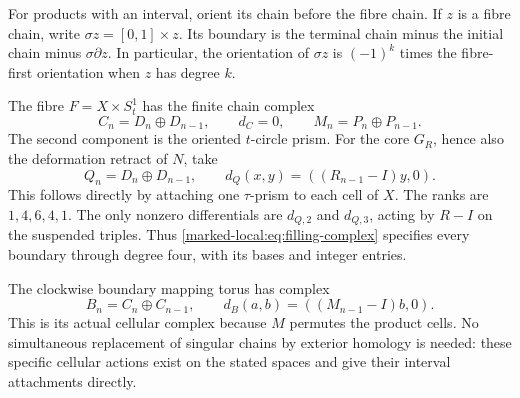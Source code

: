 For products with an interval, orient its chain before the fibre chain.
If $z$ is a fibre chain, write $\sigma z=[0,1]\times z$.
Its boundary is the terminal chain minus the initial chain minus
$\sigma\partial z$. In particular, the orientation of $\sigma z$
is $(-1)^k$ times the fibre-first orientation when $z$ has degree $k$.

The fibre $F=X\times S^1_t$ has the finite chain complex
\begin{equation}\label{marked-local:eq:fibre-complex}
 C_n=D_n\oplus D_{n-1},\qquad d_C=0,
 \qquad M_n=P_n\oplus P_{n-1}.
\end{equation}
The second component is the oriented $t$-circle prism.
For the core $G_R$, hence also the deformation retract of $N$, take
\begin{equation}\label{marked-local:eq:filling-complex}
 Q_n=D_n\oplus D_{n-1},\qquad
 d_Q(x,y)=((R_{n-1}-I)y,0).
\end{equation}
This follows directly by attaching one $\tau$-prism to each cell of $X$.
The ranks are $1,4,6,4,1$. The only nonzero differentials are
$d_{Q,2}$ and $d_{Q,3}$, acting by $R-I$ on the suspended triples.
Thus \eqref{marked-local:eq:filling-complex} specifies every boundary through degree
four, with its bases and integer entries.

The clockwise boundary mapping torus has complex
\begin{equation}\label{marked-local:eq:boundary-complex}
 B_n=C_n\oplus C_{n-1},\qquad
 d_B(a,b)=((M_{n-1}-I)b,0).
\end{equation}
This is its actual cellular complex because $M$ permutes the product
cells. No simultaneous replacement of singular chains by exterior
homology is needed: these specific cellular actions exist on the stated
spaces and give their interval attachments directly.

